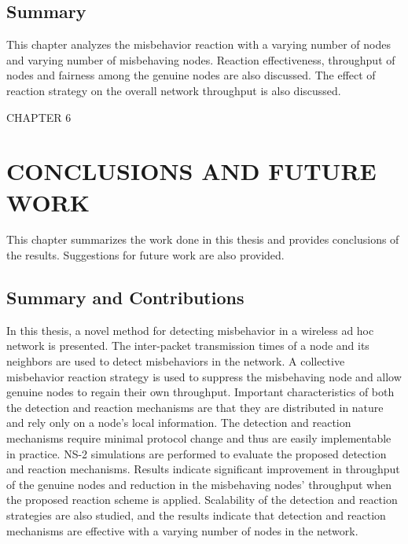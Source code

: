 \documentclass[12pt,letterpaper,english]{article}
\begin{document}
\subsection{Summary}
\label{summarysimulation}
\indent This chapter analyzes the misbehavior reaction with a varying number of nodes and varying number of misbehaving nodes. 
Reaction effectiveness, throughput of nodes and fairness among the genuine nodes are also discussed. 
The effect of reaction strategy on the overall network throughput is also discussed.
\newpage
\setcounter{figure}{0}
\setcounter{table}{0}
\setcounter{subsection}{0}
\begin{singlespace}
\begin{center}
CHAPTER 6
\section*{CONCLUSIONS AND FUTURE WORK}
\addtocounter{section}{1}
\label{chapter:conclusion}
\end{center}
\end{singlespace}
\indent This chapter summarizes the work done in this thesis and provides conclusions of the results. Suggestions for future work are also provided.
\subsection{Summary and Contributions}
\indent In this thesis, a novel method for detecting misbehavior in a wireless ad hoc network is presented.
The inter-packet transmission times of a node and its neighbors are used to detect misbehaviors in the network. 
A collective misbehavior reaction strategy is used to suppress the misbehaving node and allow genuine nodes to regain their own throughput. 
Important characteristics of both the detection and reaction mechanisms are that they are distributed in nature and rely only on a node's local information. The detection and reaction mechanisms require minimal protocol change and thus are easily implementable in practice.
NS-2 simulations are performed to evaluate the proposed detection and reaction mechanisms. Results indicate significant improvement in throughput of the genuine nodes and reduction in the misbehaving nodes' throughput when the proposed reaction scheme is applied. 
Scalability of the detection and reaction strategies are also studied, and the results indicate that detection and reaction mechanisms are effective with a varying number of nodes in the network. 
\end{document}
